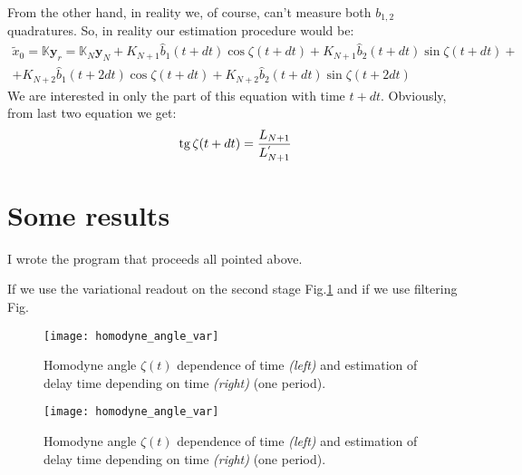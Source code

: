 \documentclass[notitlepage,a4paper,11pt,hyperref=pdftex]{revtex4-1}
\renewcommand{\tan}{\mathop{\rm tg}\nolimits}
\begin{document}
\begin{enumerate}
From the other hand, in reality we, of course, can't measure both $b_{1,2}$ quadratures. So, in reality our estimation procedure would be:
\begin{multline}
 \tilde{x}_0 = \mathbb{K}\mathbf{y}_r = \mathbb{K}_N\mathbf{y}_N + K_{N+1}\hat{b}_1(t+dt)\cos\zeta(t+dt)+K_{N+1}\hat{b}_2(t+dt)\sin\zeta(t+dt)+\\+ K_{N+2}\hat{b}_1(t+2dt)\cos\zeta(t+dt)+K_{N+2}\hat{b}_2(t+dt)\sin\zeta(t+2dt)
\end{multline}
We are interested in only the part of this equation with time $t+dt$. Obviously, from last two equation we get:
\begin{equation}
 \tan \zeta(t+dt) = \frac{L_{N+1}}{L_{N+1}^{'}}
\end{equation}
\end{enumerate}
\section{Some results}
I wrote the program that proceeds all pointed above.

If we use the variational readout on the second stage Fig.\ref{pic:hom} and if we use filtering Fig.
\begin{figure}
 \begin{minipage}{0.45\linewidth}
  \texttt{[image: homodyne\_angle\_var]}
 \end{minipage}
\hfill
 \begin{minipage}{0.45\linewidth}
 \end{minipage}
\caption{Homodyne angle $\zeta(t)$ dependence of time \textit{(left)} and estimation of delay time depending on time \textit{(right)} (one period).}
\label{pic:hom}
\end{figure}
\begin{figure}
 \begin{minipage}{0.45\linewidth}
  \texttt{[image: homodyne\_angle\_var]}
 \end{minipage}
\hfill
 \begin{minipage}{0.45\linewidth}
 \end{minipage}
\caption{Homodyne angle $\zeta(t)$ dependence of time \textit{(left)} and estimation of delay time depending on time \textit{(right)} (one period).}
\label{pic:filt}
\end{figure}
\end{document}
